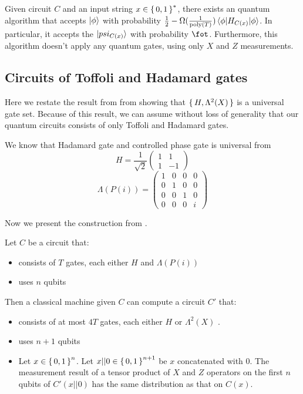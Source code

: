 \begin{thm}
	Given circuit $C$ and an input string $x\in\set{0,1}^*$, there exists an quantum algorithm that accepts $\ket{\phi}$ with probability $\frac{1}{2}-\Omega(\frac{1}{\operatorname*{\operatorname{poly}}(T)})\braket{\phi|H_{C(x)}|\phi}$. In particular, it accepts the $\ket{psi_{C(x)}}$ with probability $\fot$. Furthermore, this algorithm doesn't apply any quantum gates, using only $X$ and $Z$ measurements.
\end{thm}

\subsection{Circuits of Toffoli and Hadamard gates}

Here we restate the result from from \cite{quant-ph/0301040} showing that $\set{H, \Lambda^2(X)}$ is a universal gate set.
Because of this result, we can assume without loss of generality that our quantum circuits consists of only Toffoli and Hadamard gates.
 
 We know that Hadamard gate and controlled phase gate is universal from \cite{kitaev_1997}
$$H=\frac{1}{\sqrt{2}}\begin{pmatrix}1&1\\1&-1\end{pmatrix}$$
	$$\Lambda(P(i))=\begin{pmatrix}1&0&0&0\\0&1&0&0\\0&0&1&0\\0&0&0&i\end{pmatrix}$$

Now we present the construction from \cite{quant-ph/0301040}.

\begin{thm}
	Let $C$ be a circuit that:
	\begin{itemize}
		\item consists of $T$ gates, each either $H$ and $\Lambda(P(i))$
		\item uses $n$ qubits
	\end{itemize}
	Then a classical machine given $C$ can compute a circuit $C'$ that:
	\begin{itemize}
		\item consists of at most $4T$ gates, each either $H$ or $\Lambda^2(X)$ .
		\item uses $n+1$ qubits
		\item Let $x\in\set{0,1}^n$. Let $x|| 0\in\set{0,1}^{n+1}$ be $x$ concatenated with $0$.
		The measurement result of a tensor product of $X$ and $Z$ operators on the first $n$ qubits of $C'(x||0)$ has the same distribution as that on $C(x)$.
	\end{itemize}
\end{thm}


